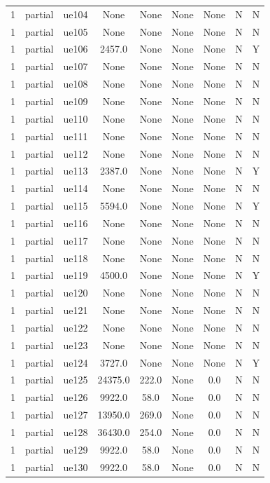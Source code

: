 \begin{table}[ht]
\begin{tabular}{|c|c|c|c|c|c|c|c|c|}
1 & partial & ue104 & None & None & None & None & N & N \\
1 & partial & ue105 & None & None & None & None & N & N \\
1 & partial & ue106 & 2457.0 & None & None & None & N & Y \\
1 & partial & ue107 & None & None & None & None & N & N \\
1 & partial & ue108 & None & None & None & None & N & N \\
1 & partial & ue109 & None & None & None & None & N & N \\
1 & partial & ue110 & None & None & None & None & N & N \\
1 & partial & ue111 & None & None & None & None & N & N \\
1 & partial & ue112 & None & None & None & None & N & N \\
1 & partial & ue113 & 2387.0 & None & None & None & N & Y \\
1 & partial & ue114 & None & None & None & None & N & N \\
1 & partial & ue115 & 5594.0 & None & None & None & N & Y \\
1 & partial & ue116 & None & None & None & None & N & N \\
1 & partial & ue117 & None & None & None & None & N & N \\
1 & partial & ue118 & None & None & None & None & N & N \\
1 & partial & ue119 & 4500.0 & None & None & None & N & Y \\
1 & partial & ue120 & None & None & None & None & N & N \\
1 & partial & ue121 & None & None & None & None & N & N \\
1 & partial & ue122 & None & None & None & None & N & N \\
1 & partial & ue123 & None & None & None & None & N & N \\
1 & partial & ue124 & 3727.0 & None & None & None & N & Y \\
1 & partial & ue125 & 24375.0 & 222.0 & None & 0.0 & N & N \\
1 & partial & ue126 & 9922.0 & 58.0 & None & 0.0 & N & N \\
1 & partial & ue127 & 13950.0 & 269.0 & None & 0.0 & N & N \\
1 & partial & ue128 & 36430.0 & 254.0 & None & 0.0 & N & N \\
1 & partial & ue129 & 9922.0 & 58.0 & None & 0.0 & N & N \\
1 & partial & ue130 & 9922.0 & 58.0 & None & 0.0 & N & N \\

\end{tabular}
\end{table}
